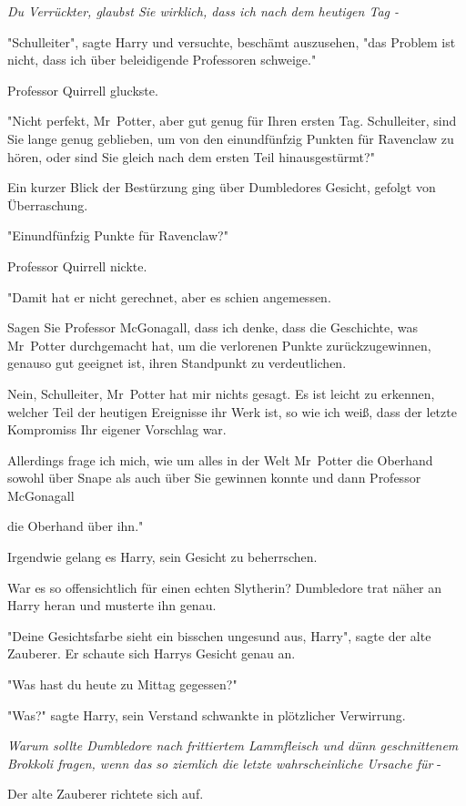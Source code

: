 {\emph{Du Verrückter, glaubst Sie wirklich, dass ich nach dem heutigen Tag -}

"Schulleiter", sagte Harry und versuchte, beschämt auszusehen, "das Problem ist nicht, dass ich über beleidigende Professoren schweige."

Professor Quirrell gluckste.

"Nicht perfekt, Mr~Potter, aber gut genug für Ihren ersten Tag. Schulleiter, sind Sie lange genug geblieben, um von den einundfünfzig Punkten für Ravenclaw zu hören, oder sind Sie gleich nach dem ersten Teil hinausgestürmt?"

Ein kurzer Blick der Bestürzung ging über Dumbledores Gesicht, gefolgt von Überraschung.

"Einundfünfzig Punkte für Ravenclaw?"

Professor Quirrell nickte.

"Damit hat er nicht gerechnet, aber es schien angemessen.

Sagen Sie Professor McGonagall, dass ich denke, dass die Geschichte, was Mr~Potter durchgemacht hat, um die verlorenen Punkte zurückzugewinnen, genauso gut geeignet ist, ihren Standpunkt zu verdeutlichen.

Nein, Schulleiter, Mr~Potter hat mir nichts gesagt. Es ist leicht zu erkennen, welcher Teil der heutigen Ereignisse ihr Werk ist, so wie ich weiß, dass der letzte Kompromiss Ihr eigener Vorschlag war.

Allerdings frage ich mich, wie um alles in der Welt Mr~Potter die Oberhand sowohl über Snape als auch über Sie gewinnen konnte und dann Professor McGonagall

die Oberhand über ihn."

Irgendwie gelang es Harry, sein Gesicht zu beherrschen.

War es so offensichtlich für einen echten Slytherin? Dumbledore trat näher an Harry heran und musterte ihn genau.

"Deine Gesichtsfarbe sieht ein bisschen ungesund aus, Harry", sagte der alte Zauberer. Er schaute sich Harrys Gesicht genau an.

"Was hast du heute zu Mittag gegessen?"

"Was?" sagte Harry, sein Verstand schwankte in plötzlicher Verwirrung.

\emph{Warum sollte Dumbledore nach frittiertem Lammfleisch und dünn geschnittenem Brokkoli fragen, wenn das so ziemlich die letzte wahrscheinliche Ursache für} -

Der alte Zauberer richtete sich auf.

}

